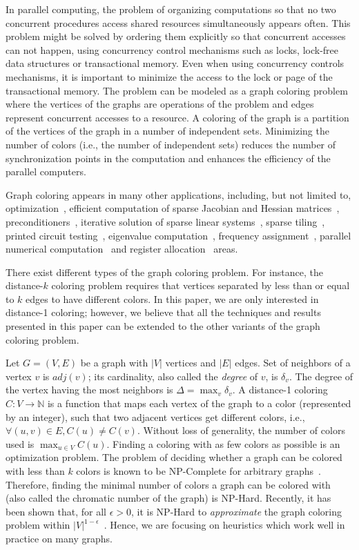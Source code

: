 \documentclass{article}
\newcommand{\card}[1]{\ensuremath{|#1|}}
\newcommand{\degree}[1]{\ensuremath{\delta_{#1}}}
\newcommand{\maxdegree}{\ensuremath{\Delta}}
\newcommand{\coloring}{\ensuremath{C}}
\newcommand{\Nset}{\ensuremath{\mathbb{N}}}
\begin{document}
In parallel computing, the problem of organizing
computations so that no two concurrent procedures access shared
resources simultaneously appears often. This problem might be solved by ordering
them explicitly so that concurrent accesses can not happen, using
concurrency control mechanisms such as locks, lock-free data structures
or transactional memory. Even when using concurrency controls
mechanisms, it is important to minimize the access to the lock or page
of the transactional memory. The problem can be modeled as a graph
coloring problem where the vertices of the graphs are operations of
the problem and edges represent concurrent accesses to a resource. A
coloring of the graph is a partition of the vertices of the graph in a number of independent
sets. Minimizing the number of colors (i.e., the number of independent sets) reduces the number of
synchronization points in the computation and enhances the efficiency
of the parallel computers. 

Graph coloring appears in many other applications, including, but not
limited to, optimization~\cite{CM83}, efficient computation of sparse Jacobian and Hessian
matrices~\cite{GMP05}, preconditioners~\cite{Saad99}, iterative solution of sparse linear
systems~\cite{Jones94}, sparse tiling~\cite{Strout02}, printed circuit
testing~\cite{Garey_circuit}, eigenvalue computation~\cite{Manne98aparallel}, frequency assignment~\cite{gamst_freq}, parallel numerical computation~\cite{ABC94} and register allocation~\cite{Chaitin} areas.

There exist different types of the graph coloring problem. For instance, 
the distance-$k$ coloring problem requires that vertices separated by less 
than or equal to $k$ edges to have different colors.
In this paper, we are only interested in distance-1
coloring; however, we believe that all the techniques and results presented
in this paper can be extended to the other variants of the graph
coloring problem.

Let $G=(V, E)$ be a graph with $\card{V}$ vertices and $\card{E}$
edges. Set of neighbors of a vertex $v$ is $adj(v)$; its
cardinality, also called the {\em degree} of $v$, is \degree{v}. The
degree of the vertex having the most neighbors is $\maxdegree = \max_v
\degree{v}$. A distance-1 coloring $\coloring:V \rightarrow \Nset$ is a function
that maps each vertex of the graph to a color (represented by an
integer), such that two adjacent vertices get different colors,
i.e., $\forall (u, v)\in E, \coloring(u) \neq \coloring(v)$. Without
loss of generality, the number of colors used is $\max_{u\in V}
\coloring(u)$. Finding a coloring with as few colors as possible
is an optimization problem. The problem of deciding whether a graph
can be colored with less than $k$ colors is known to be NP-Complete for
arbitrary graphs~\cite{matula_SL}. Therefore, finding the minimal
number of colors a graph can be colored with (also called the
chromatic number of the graph) is
NP-Hard.  Recently, it has been shown that, for all $\epsilon > 0$, it
is NP-Hard to {\em approximate} the graph coloring problem within
$\card{V}^{1-\epsilon}$~\cite{Zuckerman}. Hence, we are focusing on 
heuristics which work well in practice on many graphs.
\end{document}
